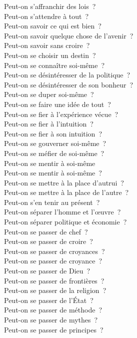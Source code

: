 \documentclass[a4paper,12pt]{article}
\begin{document}
Peut-on s'affranchir des lois ? \\
Peut-on s'attendre à tout ? \\
Peut-on savoir ce qui est bien ? \\
Peut-on savoir quelque chose de l'avenir ? \\
Peut-on savoir sans croire ? \\
Peut-on se choisir un destin ? \\
Peut-on se connaître soi-même ? \\
Peut-on se désintéresser de la politique ? \\
Peut-on se désintéresser de son bonheur ? \\
Peut-on se duper soi-même ? \\
Peut-on se faire une idée de tout ? \\
Peut-on se fier à l'expérience vécue ? \\
Peut-on se fier à l'intuition ? \\
Peut-on se fier à son intuition ? \\
Peut-on se gouverner soi-même ? \\
Peut-on se méfier de soi-même ? \\
Peut-on se mentir à soi-même \\
Peut-on se mentir à soi-même ? \\
Peut-on se mettre à la place d'autrui ? \\
Peut-on se mettre à la place de l'autre ? \\
Peut-on s'en tenir au présent ? \\
Peut-on séparer l'homme et l'œuvre ? \\
Peut-on séparer politique et économie ? \\
Peut-on se passer de chef ? \\
Peut-on se passer de croire ? \\
Peut-on se passer de croyances ? \\
Peut-on se passer de croyance ? \\
Peut-on se passer de Dieu ? \\
Peut-on se passer de frontières ? \\
Peut-on se passer de la religion ? \\
Peut-on se passer de l'État ? \\
Peut-on se passer de méthode ? \\
Peut-on se passer de mythes ? \\
Peut-on se passer de principes ? \\
\end{document}

